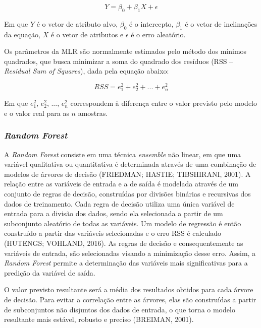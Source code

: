 \begin{equation} \label{eq:mlr}
	Y = \beta_0 + \beta_1 X + \epsilon
\end{equation}

Em que $Y$ é o vetor de atributo alvo, $\beta_0$ é o intercepto, $\beta_1$ é o vetor de inclinações da equação, $X$ é o vetor de atributos e $\epsilon$ é o erro aleatório. 

Os parâmetros da MLR são normalmente estimados pelo método dos mínimos quadrados, que busca minimizar a soma do quadrado dos resíduos (RSS – \textit{Residual Sum of Squares}), dada pela equação abaixo:

\begin{equation} \label{eq:rss}
	RSS = e_1^2 + e_2^2 + ... + e_n^2
\end{equation}

Em que $e_1^2$, $e_2^2$, ..., $e_n^2$ correspondem à diferença entre o valor previsto pelo modelo e o valor real para as $n$ amostras. 

\subsubsection{\textit{Random Forest}}

A \textit{Random Forest} consiste em uma técnica \textit{ensemble} não linear, em que uma variável qualitativa ou quantitativa é determinada através de uma combinação de modelos de árvores de decisão (FRIEDMAN; HASTIE; TIBSHIRANI, 2001). A relação entre as variáveis de entrada e a de saída é modelada através de um conjunto de regras de decisão, construídas por divisões binárias e recursivas dos dados de treinamento. Cada regra de decisão utiliza uma única variável de entrada para a divisão dos dados, sendo ela selecionada a partir de um subconjunto aleatório de todas as variáveis. Um modelo de regressão é então construído a partir das variáveis selecionadas e o erro RSS é calculado (HUTENGS; VOHLAND, 2016). As regras de decisão e consequentemente as variáveis de entrada, são selecionadas visando a minimização desse erro. Assim, a \textit{Random Forest} permite a determinação das variáveis mais significativas para a predição da variável de saída. 

O valor previsto resultante será a média dos resultados obtidos para cada árvore de decisão. Para evitar a correlação entre as árvores, elas são construídas a partir de subconjuntos não disjuntos dos dados de entrada, o que torna o modelo resultante mais estável, robusto e preciso (BREIMAN, 2001).

